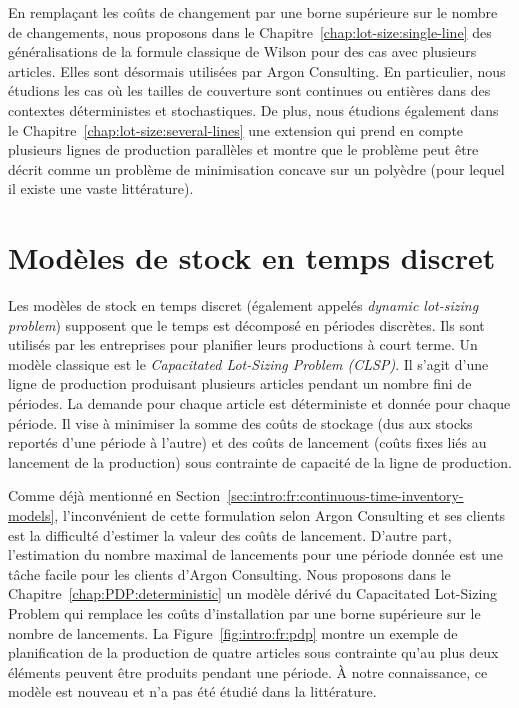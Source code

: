 \medskip


En remplaçant les coûts de changement par une borne supérieure sur le nombre de changements, nous proposons dans le Chapitre~\ref{chap:lot-size:single-line} des généralisations de la formule classique de Wilson pour des cas avec plusieurs articles.
Elles sont désormais utilisées par Argon Consulting.
En particulier, nous étudions les cas où les tailles de couverture sont continues ou entières dans des contextes déterministes et stochastiques.
De plus, nous étudions également dans le Chapitre~\ref{chap:lot-size:several-lines} une extension qui prend en compte plusieurs lignes de production parallèles et montre que le problème peut être décrit comme un problème de minimisation concave sur un polyèdre (pour lequel il existe une vaste littérature).


\section{Modèles de stock en temps discret}
\label{sec:intro:fr:discrete-time-inventory-models}


Les modèles de stock en temps discret (également appelés \emph{dynamic lot-sizing problem}) supposent que le temps est décomposé en périodes discrètes.
Ils sont utilisés par les entreprises pour planifier leurs productions à court terme.
Un modèle classique est le \emph{Capacitated Lot-Sizing Problem (CLSP)}.
Il s'agit d'une ligne de production produisant plusieurs articles pendant un nombre fini de périodes.
La demande pour chaque article est déterministe et donnée pour chaque période.
Il vise à minimiser la somme des coûts de stockage (dus aux stocks reportés d'une période à l'autre) et des coûts de lancement (coûts fixes liés au lancement de la production) sous contrainte de capacité de la ligne de production.


Comme déjà mentionné en Section~\ref{sec:intro:fr:continuous-time-inventory-models}, l'inconvénient de cette formulation selon Argon Consulting et ses clients est la difficulté d'estimer la valeur des coûts de lancement.
D'autre part, l'estimation du nombre maximal de lancements pour une période donnée est une tâche facile pour les clients d'Argon Consulting.
Nous proposons dans le Chapitre~\ref{chap:PDP:deterministic} un modèle dérivé du Capacitated Lot-Sizing Problem qui remplace les coûts d'installation par une borne supérieure sur le nombre de lancements.
La Figure~\ref{fig:intro:fr:pdp} montre un exemple de planification de la production de quatre articles sous contrainte qu'au plus deux éléments peuvent être produits pendant une période.
\`A notre connaissance, ce modèle est nouveau et n'a pas été étudié dans la littérature.


